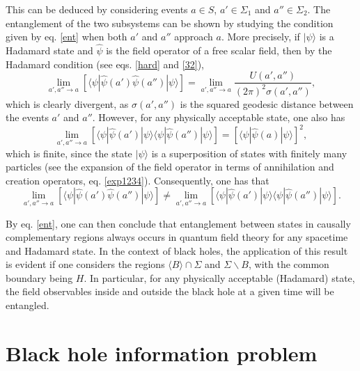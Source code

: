 \documentclass[
12pt,		%
openright,	%
twoside,  %
a4paper,			%
chapter=TITLE,		%
english,			%
french,				%
spanish,			%
brazil				%
]{USPSC-classe/USPSC}
\begin{document}
This can be deduced by considering events $a\in S$, $a'\in\Sigma_1$ and $a''\in\Sigma_2$. The entanglement of the two subsystems can be shown by studying the condition given by eq. \ref{ent} when both $a'$ and $a''$ approach $a$. More precisely, if $|\psi\rangle$ is a Hadamard state and $\hat{\psi}$ is the field operator of a free scalar field, then by the Hadamard condition (see eqs. \ref{hard} and \ref{32}),
\begin{equation}
    \lim_{a',a''\to a}\left[\langle\psi|\hat{\psi}(a')\hat{\psi}(a'')|\psi\rangle\right]=\lim_{a',a''\to a}\frac{U(a',a'')}{(2\pi)^2\sigma(a',a'')},
\end{equation}
which is clearly divergent, as $\sigma(a',a'')$ is the squared geodesic distance between the events $a'$ and $a''$. However, for any physically acceptable state, one also has
\begin{equation}\label{remarks}
    \lim_{a',a''\to a}\left[\langle\psi|\hat{\psi}(a')|\psi\rangle\langle\psi|\hat{\psi}(a'')|\psi\rangle\right]=\left[\langle\psi|\hat{\psi}(a)|\psi\rangle\right]^2,
\end{equation}
which is finite, since the state $|\psi\rangle$ is a superposition of states with finitely many particles (see the expansion of the field operator in terms of annihilation and creation operators, eq. \ref{exp1234}). Consequently, one has that
\begin{equation}
    \lim_{a',a''\to a}\left[\langle\psi|\hat{\psi}(a')\hat{\psi}(a'')|\psi\rangle\right]\neq\lim_{a',a''\to a}\left[\langle\psi|\hat{\psi}(a')|\psi\rangle\langle\psi|\hat{\psi}(a'')|\psi\rangle\right].
\end{equation}

By eq. \ref{ent}, one can then conclude that entanglement between states in causally complementary regions always occurs in quantum field theory for any spacetime and Hadamard state. In the context of black holes, the application of this result is evident if one considers the regions $\langle B\rangle\cap\Sigma$ and $\Sigma\backslash B$, with the common boundary being $H$. In particular, for any physically acceptable (Hadamard) state, the field observables inside and outside the black hole at a given time will be entangled.

\newpage



\chapter{Black hole information problem}\label{chapter4}
\end{document}
